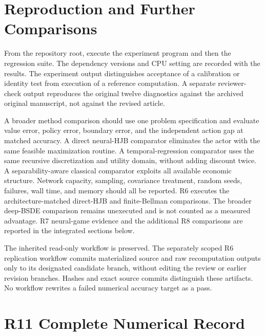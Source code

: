 \documentclass[ecta,draft]{econsocart}
\theoremstyle{definition}
\theoremstyle{remark}
\begin{document}
\section{Reproduction and Further Comparisons}
From the repository root, execute the experiment program and then the regression suite. The dependency versions and CPU setting are recorded with the results. The experiment output distinguishes acceptance of a calibration or identity test from execution of a reference computation. A separate reviewer-check output reproduces the original twelve diagnostics against the archived original manuscript, not against the revised article.

A broader method comparison should use one problem specification and evaluate value error, policy error, boundary error, and the independent action gap at matched accuracy. A direct neural-HJB comparator eliminates the actor with the same feasible maximization routine. A temporal-regression comparator uses the same recursive discretization and utility domain, without adding discount twice. A separability-aware classical comparator exploits all available economic structure. Network capacity, sampling, covariance treatment, random seeds, failures, wall time, and memory should all be reported. R6 executes the architecture-matched direct-HJB and finite-Bellman comparisons. The broader deep-BSDE comparison remains unexecuted and is not counted as a measured advantage. R7 neural-game evidence and the additional R8 comparisons are reported in the integrated sections below.

The inherited read-only workflow is preserved. The separately scoped R6 replication workflow commits materialized source and raw recomputation outputs only to its designated candidate branch, without editing the review or earlier revision branches. Hashes and exact source commits distinguish these artifacts. No workflow rewrites a failed numerical accuracy target as a pass.










\section{R11 Complete Numerical Record}\label{app:r11record}






\end{document}
